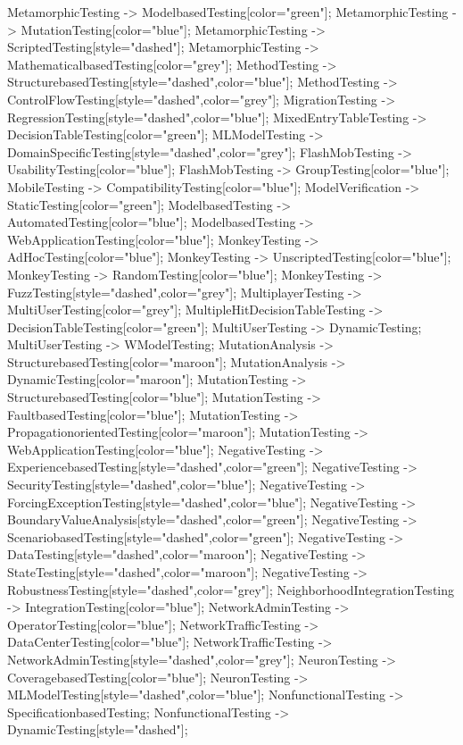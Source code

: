 \documentclass{article}
\begin{document}
{MetamorphicTesting -> ModelbasedTesting[color="green"];
MetamorphicTesting -> MutationTesting[color="blue"];
MetamorphicTesting -> ScriptedTesting[style="dashed"];
MetamorphicTesting -> MathematicalbasedTesting[color="grey"];
MethodTesting -> StructurebasedTesting[style="dashed",color="blue"];
MethodTesting -> ControlFlowTesting[style="dashed",color="grey"];
MigrationTesting -> RegressionTesting[style="dashed",color="blue"];
MixedEntryTableTesting -> DecisionTableTesting[color="green"];
MLModelTesting -> DomainSpecificTesting[style="dashed",color="grey"];
FlashMobTesting -> UsabilityTesting[color="blue"];
FlashMobTesting -> GroupTesting[color="blue"];
MobileTesting -> CompatibilityTesting[color="blue"];
ModelVerification -> StaticTesting[color="green"];
ModelbasedTesting -> AutomatedTesting[color="blue"];
ModelbasedTesting -> WebApplicationTesting[color="blue"];
MonkeyTesting -> AdHocTesting[color="blue"];
MonkeyTesting -> UnscriptedTesting[color="blue"];
MonkeyTesting -> RandomTesting[color="blue"];
MonkeyTesting -> FuzzTesting[style="dashed",color="grey"];
MultiplayerTesting -> MultiUserTesting[color="grey"];
MultipleHitDecisionTableTesting -> DecisionTableTesting[color="green"];
MultiUserTesting -> DynamicTesting;
MultiUserTesting -> WModelTesting;
MutationAnalysis -> StructurebasedTesting[color="maroon"];
MutationAnalysis -> DynamicTesting[color="maroon"];
MutationTesting -> StructurebasedTesting[color="blue"];
MutationTesting -> FaultbasedTesting[color="blue"];
MutationTesting -> PropagationorientedTesting[color="maroon"];
MutationTesting -> WebApplicationTesting[color="blue"];
NegativeTesting -> ExperiencebasedTesting[style="dashed",color="green"];
NegativeTesting -> SecurityTesting[style="dashed",color="blue"];
NegativeTesting -> ForcingExceptionTesting[style="dashed",color="blue"];
NegativeTesting -> BoundaryValueAnalysis[style="dashed",color="green"];
NegativeTesting -> ScenariobasedTesting[style="dashed",color="green"];
NegativeTesting -> DataTesting[style="dashed",color="maroon"];
NegativeTesting -> StateTesting[style="dashed",color="maroon"];
NegativeTesting -> RobustnessTesting[style="dashed",color="grey"];
NeighborhoodIntegrationTesting -> IntegrationTesting[color="blue"];
NetworkAdminTesting -> OperatorTesting[color="blue"];
NetworkTrafficTesting -> DataCenterTesting[color="blue"];
NetworkTrafficTesting -> NetworkAdminTesting[style="dashed",color="grey"];
NeuronTesting -> CoveragebasedTesting[color="blue"];
NeuronTesting -> MLModelTesting[style="dashed",color="blue"];
NonfunctionalTesting -> SpecificationbasedTesting;
NonfunctionalTesting -> DynamicTesting[style="dashed"];
}
\end{document}
